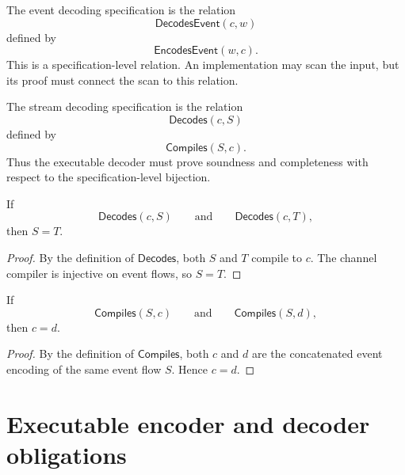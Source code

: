 \begin{definition}
\label{def:implementation-interface-event-decoder-spec}
The event decoding specification is the relation
$$
  \mathsf{DecodesEvent}(c,w)
$$
defined by
$$
  \mathsf{EncodesEvent}(w,c).
$$
This is a specification-level relation. An implementation may scan the input, but its proof must connect the scan to this relation.
\end{definition}

\begin{definition}
\label{def:implementation-interface-stream-decoder-spec}
The stream decoding specification is the relation
$$
  \mathsf{Decodes}(c,S)
$$
defined by
$$
  \mathsf{Compiles}(S,c).
$$
Thus the executable decoder must prove soundness and completeness with respect to the specification-level bijection.
\end{definition}

\begin{proposition}
\label{prop:implementation-interface-decoder-functional}
If
$$
  \mathsf{Decodes}(c,S)
  \qquad\text{and}\qquad
  \mathsf{Decodes}(c,T),
$$
then $S=T$.
\end{proposition}

\begin{proof}
By the definition of $\mathsf{Decodes}$, both $S$ and $T$ compile to $c$. The channel compiler is injective on event flows, so $S=T$.
\end{proof}

\begin{proposition}
\label{prop:implementation-interface-compiler-functional}
If
$$
  \mathsf{Compiles}(S,c)
  \qquad\text{and}\qquad
  \mathsf{Compiles}(S,d),
$$
then $c=d$.
\end{proposition}

\begin{proof}
By the definition of $\mathsf{Compiles}$, both $c$ and $d$ are the concatenated event encoding of the same event flow $S$. Hence $c=d$.
\end{proof}

\section{Executable encoder and decoder obligations}
\label{sec:implementation-interface-executable-obligations}

